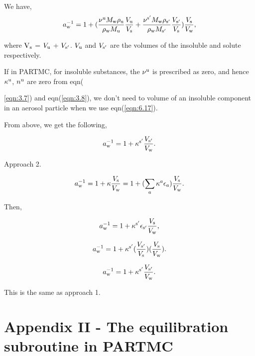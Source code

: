 \documentclass[12pt]{article}
\begin{document}
We have,
\begin{equation}\label{eqn:A5}
a_{\rm w}^{-1}=1+ (  \frac{\nu^{\rm u} M_{\rm w} \rho_{\rm u}}{\rho_{\rm w}M_{\rm u}} 
\frac{V_{\rm u}}{V_{\rm s}} +
\frac{\nu^{\rm s'} M_{\rm w} \rho_{\rm s'}}{\rho_{\rm w} M_{\rm s'}}    
\frac{V_{\rm s'}}{V_{\rm s}})
\frac{V_{\rm s}}{V_{\rm w}},
\end{equation}

where $\rm V_{\rm s}$ = $ V_{\rm u}$ + $V_{\rm s'}$. $V_{\rm u}$ and $V_{\rm s'}$ are the volumes of the insoluble and solute respectively.

If in PARTMC, for insoluble substances, the $\nu^{\rm u}$ is prescribed as zero, and hence $\kappa^{\rm u}$, $n^{\rm u}$  are zero from eqn({\ref{eqn:3.7}) and eqn(\ref{eqn:3.8}), we don't need to volume of an insoluble component in an aerosol particle when we use eqn(\ref{eqn:6.17}).

From above, we get the following,

\begin{equation}\label{eqn:A6}
a_{\rm w}^{-1}=1+ \kappa^{\rm s'} \frac{V_{\rm s'}}{V_{\rm w}}.
\end{equation}

Approach 2.

\begin{equation}\label{eqn:A7}
a_{\rm w}^{-1}=1+\kappa \frac{V_{\rm s}}{V_{\rm w}}=1+ (\sum_{a} \kappa^{a} \epsilon_{a})\frac{V_{\rm s}}{V_{\rm w}}.
\end{equation}

Then,

\begin{equation}\label{eqn:A8}
a_{\rm w}^{-1}=1+ \kappa^{\rm s'} \epsilon_{\rm s'} \frac{V_{\rm s}}{V_{\rm w}},
\end{equation}

\begin{equation}\label{eqn:A9}
a_{\rm w}^{-1}=1+ \kappa^{\rm s'} (\frac{V_{\rm s'}}{V_{\rm s}})(\frac{V_{\rm s}}{V_{\rm w}}).
\end{equation}

\begin{equation}\label{eqn:A10}
a_{\rm w}^{-1}=1+ \kappa^{\rm s'} \frac{V_{\rm s'}}{V_{\rm w}}.
\end{equation}

This is the same as approach 1. 


\section{Appendix II - The equilibration subroutine in PARTMC}

}
\end{document}
